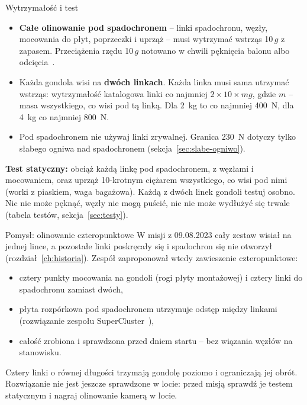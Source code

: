 \begin{podsekcja}{Wytrzymałość i test}\label{sec:olinowanie-wytrz}
\begin{itemize}
  \item \textbf{Całe olinowanie pod spadochronem} -- linki spadochronu, węzły, mocowania do płyt, poprzeczki i uprząż -- musi wytrzymać wstrząs 10\,$g$ z zapasem. Przeciążenia rzędu 10\,$g$ notowano w chwili pęknięcia balonu albo odcięcia~\cite{magrian2018}.
  \item Każda gondola wisi na \textbf{dwóch linkach}. Każda linka musi sama utrzymać wstrząs: wytrzymałość katalogowa linki co najmniej $2 \times 10 \times m g$, gdzie $m$ -- masa wszystkiego, co wisi pod tą linką. Dla \SI{2}{kg} to co najmniej \SI{400}{N}, dla \SI{4}{kg} co najmniej \SI{800}{N}.
  \item Pod spadochronem nie używaj linki zrywalnej. Granica \SI{230}{N} dotyczy tylko słabego ogniwa nad spadochronem (sekcja~\ref{sec:slabe-ogniwo}).
\end{itemize}

\textbf{Test statyczny:} obciąż każdą linkę pod spadochronem, z węzłami i mocowaniem, oraz uprząż 10-krotnym ciężarem wszystkiego, co wisi pod nimi (worki z piaskiem, waga bagażowa). Każdą z dwóch linek gondoli testuj osobno. Nic nie może pęknąć, węzły nie mogą puścić, nic nie może wydłużyć się trwale (tabela testów, sekcja~\ref{sec:testy}).

\label{fig:pociag}
\end{podsekcja}

\begin{podsekcja}{Pomysł: olinowanie czteropunktowe}
W misji z 09.08.2023 cały zestaw wisiał na jednej lince, a pozostałe linki poskręcały się i spadochron się nie otworzył (rozdział~\ref{ch:historia}). Zespół zaproponował wtedy zawieszenie czteropunktowe:
\begin{itemize}
  \item cztery punkty mocowania na gondoli (rogi płyty montażowej) i cztery linki do spadochronu zamiast dwóch,
  \item płyta rozpórkowa pod spadochronem utrzymuje odstęp między linkami (rozwiązanie zespołu SuperCluster~\cite{supercluster}),
  \item całość zrobiona i sprawdzona przed dniem startu -- bez wiązania węzłów na stanowisku.
\end{itemize}
Cztery linki o równej długości trzymają gondolę poziomo i ograniczają jej obrót. Rozwiązanie nie jest jeszcze sprawdzone w locie: przed misją sprawdź je testem statycznym i nagraj olinowanie kamerą w locie.
\end{podsekcja}

